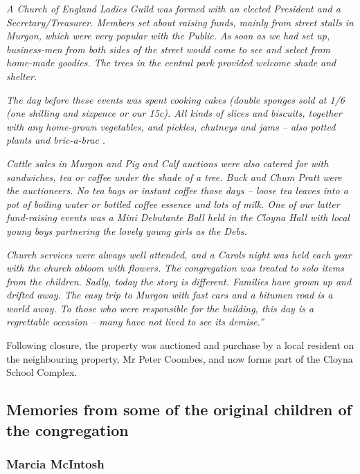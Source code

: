 \emph{A Church of England Ladies Guild was formed with an elected President and a Secretary/Treasurer. Members set about raising funds, mainly from street stalls in Murgon, which were very popular with the Public.} \emph{As soon as we had set up, business-men from both sides of the street would come to see and select from home-made goodies. The trees in the central park provided welcome shade and shelter.}



\emph{The day before these events was spent cooking cakes (double sponges sold at 1/6 (one shilling and sixpence or our 15c). All kinds of slices and biscuits, together with any home-grown vegetables, and pickles, chutneys and jams -- also potted plants and bric-a-brac .}



\emph{Cattle sales in Murgon and Pig and Calf auctions were also catered for with sandwiches, tea or coffee under the shade of a tree. Buck and Chum Pratt were the auctioneers. No tea bags or instant coffee those days -- loose tea leaves into a pot of boiling water or bottled coffee essence and lots of milk. One of our latter fund-raising events was a Mini Debutante Ball held in the Cloyna Hall with local young boys partnering the lovely young girls as the Debs.}



\emph{Church services were always well attended, and a Carols night was held each year with the church abloom with flowers. The congregation was treated to solo items from the children. Sadly, today the story is different. Families have grown up and drifted away. The easy trip to Murgon with fast cars and a bitumen road is a world away. To those who were responsible for the building, this day is a regrettable occasion -- many have not lived to see its demise.''}



Following closure, the property was auctioned and purchase by a local resident on the neighbouring property, Mr Peter Coombes, and now forms part of the Cloyna School Complex.



\subsection{Memories from some of the original children of the congregation}



\subsubsection{Marcia McIntosh}




